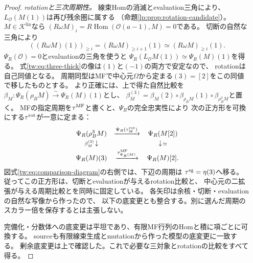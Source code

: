 \begin{proof}
\emph{rotationと三次周期性。}
線束Homの消滅とevaluation三角により、$L_{\mathcal O}(M(1))$は再び残余圏に属する
（命題\ref{lp:prop:rotation-candidate}）。
$M\in\mathcal K^{\mathrm{lin}}$なら
$(R\omega M)_i=R\operatorname{Hom}(\mathcal O(a-1),M)=0$である。
切断の自然な三角により
\begin{equation}\label{tw:eq:rotation-cut}
 ((R\omega M)(1))_{\ge i}
 =(R\omega M)_{\ge i+1}(1)
 \simeq(R\omega M)_{\ge i}(1).
\end{equation}
$\Psi_R(\mathcal O)=0$とevaluationの三角を使うと
$\Psi_R(L_{\mathcal O}M(1))\simeq\Psi_R(M)(1)$を得る。
式\eqref{tw:eq:three-thick}の像は$(1)$と$(-1)$の両方で安定なので、
rotationは自己同値となる。
周期同型はMFで中心元$\Omega$から定まる$(3)=[2]$をこの同値で移したものとする。
より正確には、上で得た自然比較を
$\beta_M:\Psi_R(\rho_BM)\xrightarrow{\sim}\Psi_R(M)(1)$とし、
$\beta_M^{(3)}=\beta_M(2)\circ\beta_{\rho_BM}(1)\circ\beta_{\rho_B^2M}$と置く。
MFの指定周期を$\tau^{\rm MF}$と書くと、$\Psi_R$の完全忠実性により
次の正方形を可換にする$\tau^{\rm rot}$が一意に定まる：
\begin{equation}\label{tw:eq:rotation-period-square}
 \begin{array}{ccc}
 \Psi_R(\rho_B^3M)&\xrightarrow{\Psi_R(\tau_M^{\rm rot})}&\Psi_R(M[2])\\[2pt]
 {\scriptstyle\beta_M^{(3)}}\!\downarrow&&\downarrow\!{\scriptstyle\simeq}\\[2pt]
 \Psi_R(M)(3)&\xrightarrow{\tau_{\Psi_R(M)}^{\rm MF}}&\Psi_R(M)[2].
 \end{array}
\end{equation}
図式\eqref{tw:eq:comparison-diagram}の右側では、下辺の周期は
$\tau^{\rm sg}=\eta(3)$へ移る。
従ってこの正方形は、切断とevaluationが与えるrotation比較と、
中心元の二拡張が与える周期比較とを同時に固定している。
各矢印は余核・切断・evaluationの自然な写像から作ったので、
以下の底変更とも整合する。別に選んだ周期のスカラー倍を保存するとは主張しない。

完備化・分数体への底変更は平坦であり、有限MF行列のHomと積に項ごとに可換する。
sourceも有限線束生成とmutationから作った模型の底変更に一致する。
剰余底変更は上で確認した。これで必要な三対象とrotationの比較をすべて得る。
\end{proof}
